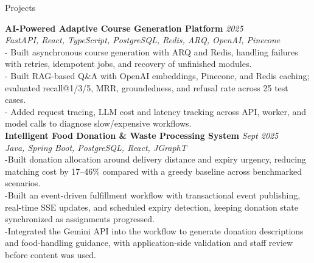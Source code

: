 \documentclass{resume}
\begin{document}
\begin{rSection}{Projects}

\textbf{AI-Powered Adaptive Course Generation Platform} \hfill {\em 2025} \\
\textit{FastAPI, React, TypeScript, PostgreSQL, Redis, ARQ, OpenAI, Pinecone} \\
- Built asynchronous course generation with ARQ and Redis, handling failures with retries, idempotent jobs, and recovery of unfinished modules. \\
- Built RAG-based Q\&A with OpenAI embeddings, Pinecone, and Redis caching; evaluated recall@1/3/5, MRR, groundedness, and refusal rate across 25 test cases. \\
- Added request tracing, LLM cost and latency tracking across API, worker, and model calls to diagnose slow/expensive workflows.\\
\textbf{Intelligent Food Donation \& Waste Processing System} \hfill {\em Sept 2025} \\
\textit{Java, Spring Boot, PostgreSQL, React, JGraphT} \\
-Built donation allocation around delivery distance and expiry urgency, reducing matching cost by 17–46\% compared with a greedy baseline across benchmarked scenarios.\\
-Built an event-driven fulfillment workflow with transactional event publishing, real-time SSE updates, and scheduled expiry detection, keeping donation state synchronized as assignments progressed.\\
-Integrated the Gemini API into the workflow to generate donation descriptions and food-handling guidance, with application-side validation and staff review before content was used.
\end{rSection}
\end{document}
